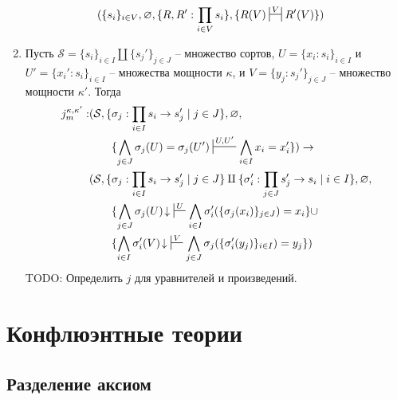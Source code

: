 \documentclass[reqno]{amsart}
\theoremstyle{definition}
\theoremstyle{remark}
\newcommand{\I}{\mathrm{I}}
\begin{document}
\begin{enumerate}
\begin{align*}
             & (\{ s_i \}_{i \in V}, \varnothing, \{ R, R' : \prod_{i \in V} s_i \}, \{ R(V) \ssststile{}{V} R'(V) \})
\end{align*}
\item Пусть $\mathcal{S} = \{ s_i \}_{i \in I} \amalg \{ s_j' \}_{j \in J}$ -- множество сортов,
$U = \{ x_i : s_i \}_{i \in I}$ и $U' = \{ x_i' : s_i \}_{i \in I}$ -- множества мощности $\kappa$,
и $V = \{ y_j : s_j' \}_{j \in J}$ -- множество мощности $\kappa'$.
Тогда
\begin{align*}
j_m^{\kappa,\kappa'} : & (\mathcal{S}, \{ \sigma_j : \prod_{i \in I} s_i \to s_j' \mid j \in J \}, \varnothing, \\
                       & \qquad \{ \bigwedge_{j \in J} \sigma_j(U) = \sigma_j(U') \sststile{}{U,U'} \bigwedge_{i \in I} x_i = x_i' \}) \to \\
                       & (\mathcal{S}, \{ \sigma_j : \prod_{i \in I} s_i \to s_j' \mid j \in J \} \amalg \{ \sigma_i' : \prod_{j \in J} s_j' \to s_i \mid i \in I \}, \varnothing, \\
                       & \qquad \{ \bigwedge_{j \in J} \sigma_j(U)\!\downarrow\ \sststile{}{U} \bigwedge_{i \in I} \sigma_i'(\{ \sigma_j(x_i) \}_{j \in J}) = x_i \} \cup \\
                       & \qquad \{ \bigwedge_{i \in I} \sigma_i'(V)\!\downarrow\ \sststile{}{V} \bigwedge_{j \in J} \sigma_j(\{ \sigma_i'(y_j) \}_{i \in I}) = y_j \})
\end{align*}
TODO: Определить $j$ для уравнителей и произведений.
\end{enumerate}


\section{Конфлюэнтные теории}

\subsection{Разделение аксиом}
\end{document}
